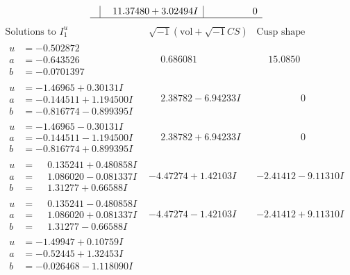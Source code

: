 \documentclass[1p]{elsarticle_modified}
\theoremstyle{definition}
\newcommand{\I}{\sqrt{-1}}
\begin{document}
$$\begin{array}{c|c|c}
 & \phantom{-}11.37480 + 3.02494 I & \phantom{-0.000000 } 0\\
 \hline 
 \end{array}$$\newpage$$\begin{array}{c|c|c}  
\text{Solutions to }I^u_{1}& \I (\text{vol} + \sqrt{-1}CS) & \text{Cusp shape}\\
 \hline 
\begin{aligned}
u &= -0.502872\phantom{ +0.000000I} \\
a &= -0.643526\phantom{ +0.000000I} \\
b &= -0.0701397\phantom{ +0.000000I}\end{aligned}
 & \phantom{-}0.686081\phantom{ +0.000000I} & \phantom{-}15.0850\phantom{ +0.000000I} \\ \hline\begin{aligned}
u &= -1.46965 + 0.30131 I \\
a &= -0.144511 + 1.194500 I \\
b &= -0.816774 - 0.899395 I\end{aligned}
 & \phantom{-}2.38782 - 6.94233 I & \phantom{-0.000000 } 0 \\ \hline\begin{aligned}
u &= -1.46965 - 0.30131 I \\
a &= -0.144511 - 1.194500 I \\
b &= -0.816774 + 0.899395 I\end{aligned}
 & \phantom{-}2.38782 + 6.94233 I & \phantom{-0.000000 } 0 \\ \hline\begin{aligned}
u &= \phantom{-}0.135241 + 0.480858 I \\
a &= \phantom{-}1.086020 - 0.081337 I \\
b &= \phantom{-}1.31277 + 0.66588 I\end{aligned}
 & -4.47274 + 1.42103 I & -2.41412 - 9.11310 I \\ \hline\begin{aligned}
u &= \phantom{-}0.135241 - 0.480858 I \\
a &= \phantom{-}1.086020 + 0.081337 I \\
b &= \phantom{-}1.31277 - 0.66588 I\end{aligned}
 & -4.47274 - 1.42103 I & -2.41412 + 9.11310 I \\ \hline\begin{aligned}
u &= -1.49947 + 0.10759 I \\
a &= -0.52445 + 1.32453 I \\
b &= -0.026468 - 1.118090 I\end{aligned}

\end{array}$$
\end{document}

